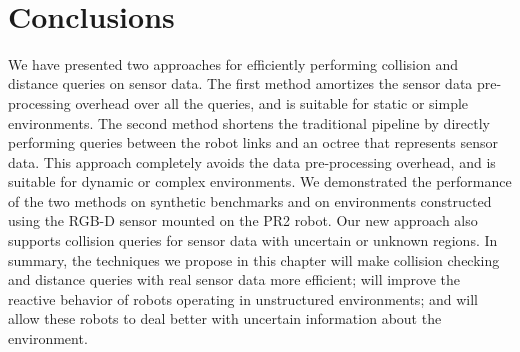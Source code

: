 \begin{table}[ht]
\centering
{}
\\
\caption[Collision and distance query performance comparison between the baseline pipeline in~\cite{Rusu:RPG:2009} and our new pipeline on the PR2 robot]{Collision and distance query performance comparison between the baseline pipeline in~\cite{Rusu:RPG:2009} and our new pipeline on the PR2 robot (in ms). For the collision query, the broad-phase structure computed by the baseline algorithm improves the total computation only when there are more than $N_{min} = 3275$ collision queries for one frame of sensor data, and the total time required for $N_{min}$ queries is 4.29 ms. For the distance query, the broad-phase structure computed by the baseline algorithm improves the total computation only when there are more than $N_{min} = 18$ collision queries for one frame of sensor data, and the total time required for $N_{min}$ queries is 0.87 ms.
\label{table:8:pr2}}
\end{table}




\section{Conclusions}

We have presented two approaches for efficiently performing collision and distance
queries on sensor data. The first method amortizes the sensor data pre-processing
overhead over all the queries, and is suitable for static or simple
environments. The second method shortens the traditional pipeline by
directly performing queries between the robot links and an octree that
represents sensor data. This approach completely avoids the data
pre-processing overhead, and is suitable for dynamic or complex
environments. We demonstrated the performance of the two methods on
synthetic benchmarks and on environments constructed using the RGB-D
sensor mounted on the PR2 robot. Our new approach also supports
collision queries for sensor data with uncertain or unknown regions.
In summary, the techniques we propose in this chapter will make
collision checking and distance queries with real sensor data more efficient;
will improve the reactive behavior of robots operating in unstructured
environments; and will allow these robots to deal better with uncertain information
about the environment.

